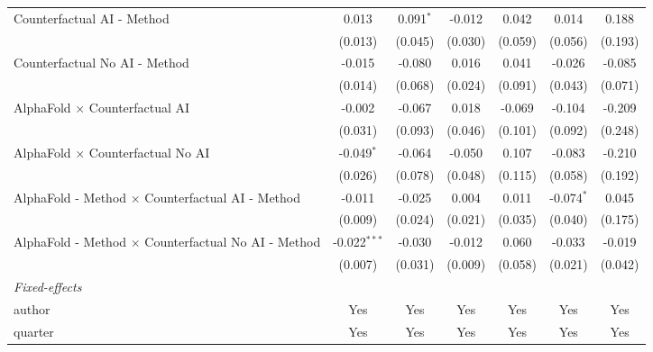 \begin{tabular}{lcccccc}
   Counterfactual AI - Method                                 & 0.013          & 0.091$^{*}$ & -0.012       & 0.042   & 0.014         & 0.188\\   
                                                              & (0.013)        & (0.045)     & (0.030)      & (0.059) & (0.056)       & (0.193)\\   
   Counterfactual No AI - Method                              & -0.015         & -0.080      & 0.016        & 0.041   & -0.026        & -0.085\\   
                                                              & (0.014)        & (0.068)     & (0.024)      & (0.091) & (0.043)       & (0.071)\\   
   AlphaFold $\times$ Counterfactual AI                       & -0.002         & -0.067      & 0.018        & -0.069  & -0.104        & -0.209\\   
                                                              & (0.031)        & (0.093)     & (0.046)      & (0.101) & (0.092)       & (0.248)\\   
   AlphaFold $\times$ Counterfactual No AI                    & -0.049$^{*}$   & -0.064      & -0.050       & 0.107   & -0.083        & -0.210\\   
                                                              & (0.026)        & (0.078)     & (0.048)      & (0.115) & (0.058)       & (0.192)\\   
   AlphaFold - Method $\times$ Counterfactual AI - Method     & -0.011         & -0.025      & 0.004        & 0.011   & -0.074$^{*}$  & 0.045\\   
                                                              & (0.009)        & (0.024)     & (0.021)      & (0.035) & (0.040)       & (0.175)\\   
   AlphaFold - Method $\times$ Counterfactual No AI - Method  & -0.022$^{***}$ & -0.030      & -0.012       & 0.060   & -0.033        & -0.019\\   
                                                              & (0.007)        & (0.031)     & (0.009)      & (0.058) & (0.021)       & (0.042)\\   
   \midrule
   \emph{Fixed-effects}\\
   author                                                     & Yes            & Yes         & Yes          & Yes     & Yes           & Yes\\  
   quarter                                                    & Yes            & Yes         & Yes          & Yes     & Yes           & Yes\\  

\end{tabular}
